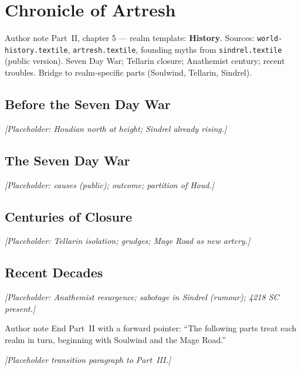 \chapter{Chronicle of Artresh}

\begin{DndComment}{Author note}
  Part~II, chapter 5 --- realm template: \textbf{History}.
  Sources: \texttt{world-history.textile}, \texttt{artresh.textile}, founding myths from \texttt{sindrel.textile} (public version).
  Seven Day War; Tellarin closure; Anathemist century; recent troubles. Bridge to realm-specific parts (Soulwind, Tellarin, Sindrel).
\end{DndComment}

\section{Before the Seven Day War}

\textit{[Placeholder: Houdian north at height; Sindrel already rising.]}

\section{The Seven Day War}

\textit{[Placeholder: causes (public); outcome; partition of Houd.]}

\section{Centuries of Closure}

\textit{[Placeholder: Tellarin isolation; grudges; Mage Road as new artery.]}

\section{Recent Decades}

\textit{[Placeholder: Anathemist resurgence; sabotage in Sindrel (rumour); 4218 SC present.]}

\begin{DndComment}{Author note}
  End Part~II with a forward pointer: ``The following parts treat each realm in turn, beginning with Soulwind and the Mage Road.''
\end{DndComment}

\textit{[Placeholder transition paragraph to Part~III.]}
